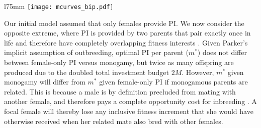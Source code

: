\documentclass[10pt,letterpaper]{article}
\begin{document}
\begin{wrapfigure}[25]{l}{75mm}
\texttt{[image: mcurves\_bip.pdf]}
\captionsetup{labelformat=empty} 
\caption{} 
\label{mcurves_bip} %
\end{wrapfigure} %
Our initial model assumed that only females provide PI. We now consider the opposite extreme, where PI is provided by two parents that pair exactly once in life and therefore have completely overlapping fitness interests \cite[i.e., strict monogamy;][]{Parker1985}. Given Parker's \citeyearpar{Parker1985} implicit assumption of outbreeding, optimal PI per parent ($m^{*}$) does not differ between female-only PI versus monogamy, but twice as many offspring are produced due to the doubled total investment budget $2M$. However, $m^{*}$ given monogamy will differ from $m^{*}$ given female-only PI if monogamous parents are related. This is because a male is by definition precluded from mating with another female, and therefore pays a complete opportunity cost for inbreeding \cite[][]{Waser1986}. A focal female will thereby lose any inclusive fitness increment that she would have otherwise received when her related mate also bred with other females.
\end{document}
